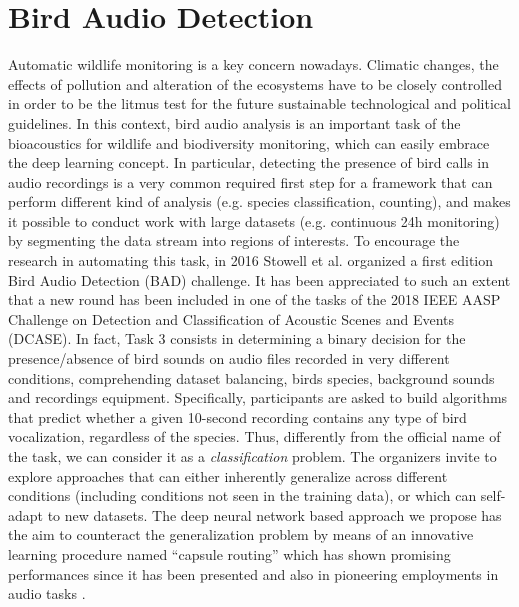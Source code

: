 
\section{Bird Audio Detection}


Automatic wildlife monitoring is a key concern nowadays. Climatic changes, the effects of pollution and alteration of the ecosystems have to be closely controlled in order to be the litmus test for the future sustainable technological and political guidelines.
In this context, bird audio analysis is an important task of the bioacoustics for wildlife and biodiversity monitoring, which can easily embrace the deep learning concept.
In particular, detecting the presence of bird calls in audio recordings is a very common required first step for a framework that can perform different kind of  analysis (e.g. species classification, counting), and makes it possible to conduct work with large datasets (e.g. continuous 24h monitoring) by segmenting the data stream into regions of interests.
To encourage the research in automating this task, in 2016 Stowell et al. \cite{stowell2016bird} organized a first edition Bird Audio Detection (BAD) challenge. It has been appreciated to such an extent that a new round has been included in one of the tasks of the 2018 IEEE AASP Challenge on Detection and Classification of Acoustic Scenes and Events (DCASE). In fact, Task 3 consists in determining a binary decision for the presence/absence of bird sounds on audio files recorded in very different conditions, comprehending dataset balancing, birds species, background sounds and recordings equipment.
Specifically, participants are asked to build algorithms that predict whether a given 10-second recording contains any type of bird vocalization, regardless of the species. Thus, differently from the official name of the task, we can consider it as a \textit{classification} problem.
The organizers invite to explore approaches that can either inherently generalize across different conditions (including conditions not seen in the training data), or which can self-adapt to new datasets. The deep neural network based approach we propose has the aim to counteract the generalization problem by means of an innovative learning procedure named ``capsule routing'' which has shown promising performances since it has been presented \cite{sabour2017dynamic} and also in pioneering employments in audio tasks \cite{iqbal2018capsule}.


